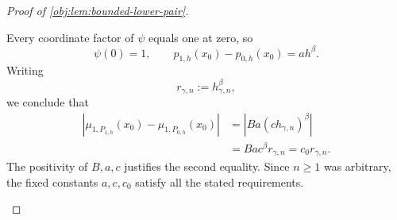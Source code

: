 \begin{proof}[Proof of \cref{obj:lem:bounded-lower-pair}]
\begin{enumerate}
Every coordinate factor of \(\psi\) equals one at zero, so
\[
\psi(0)=1,
\qquad
p_{1,h}(x_0)-p_{0,h}(x_0)=ah^\beta.
\]
Writing
\[
r_{\gamma,n}:=h_{\gamma,n}^{\beta},
\]
we conclude that
\[
\begin{aligned}
\left|\mu_{1,P_{1,h}}(x_0)-\mu_{1,P_{0,h}}(x_0)\right|
&=\left|Ba(ch_{\gamma,n})^\beta\right|\\
&=Bac^\beta r_{\gamma,n}
=c_0r_{\gamma,n}.
\end{aligned}
\]
The positivity of \(B,a,c\) justifies the second equality. Since \(n\ge1\)
was arbitrary, the fixed constants \(a,c,c_0\) satisfy all the stated
requirements.
\end{enumerate}
\end{proof}
